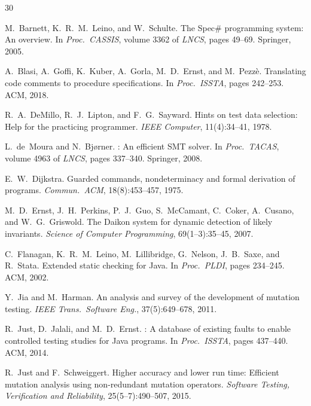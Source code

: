 \documentclass[11pt]{article}
\begin{document}
\begin{thebibliography}{30}

M.~Barnett, K.~R.~M.~Leino, and W.~Schulte.
\newblock The {Spec\#} programming system: An overview.
\newblock In \emph{Proc.\ CASSIS}, volume 3362 of \emph{LNCS}, pages 49--69.
  Springer, 2005.

A.~Blasi, A.~Goffi, K.~Kuber, A.~Gorla, M.~D.~Ernst, and M.~Pezz\`{e}.
\newblock Translating code comments to procedure specifications.
\newblock In \emph{Proc.\ ISSTA}, pages 242--253. ACM, 2018.

R.~A.~DeMillo, R.~J.~Lipton, and F.~G.~Sayward.
\newblock Hints on test data selection: Help for the practicing programmer.
\newblock \emph{IEEE Computer}, 11(4):34--41, 1978.

L.~de~Moura and N.~Bj{\o}rner.
: An efficient {SMT} solver.
\newblock In \emph{Proc.\ TACAS}, volume 4963 of \emph{LNCS}, pages 337--340.
  Springer, 2008.

E.~W.~Dijkstra.
\newblock Guarded commands, nondeterminacy and formal derivation of programs.
\newblock \emph{Commun.\ ACM}, 18(8):453--457, 1975.

M.~D.~Ernst, J.~H.~Perkins, P.~J.~Guo, S.~McCamant, C.~Coker, A.~Cusano,
  and W.~G.~Griswold.
\newblock The {Daikon} system for dynamic detection of likely invariants.
\newblock \emph{Science of Computer Programming}, 69(1--3):35--45, 2007.

C.~Flanagan, K.~R.~M.~Leino, M.~Lillibridge, G.~Nelson, J.~B.~Saxe, and
  R.~Stata.
\newblock Extended static checking for {Java}.
\newblock In \emph{Proc.\ PLDI}, pages 234--245. ACM, 2002.

Y.~Jia and M.~Harman.
\newblock An analysis and survey of the development of mutation testing.
\newblock \emph{IEEE Trans.\ Software Eng.}, 37(5):649--678, 2011.

R.~Just, D.~Jalali, and M.~D.~Ernst.
: A database of existing faults to enable controlled
  testing studies for {Java} programs.
\newblock In \emph{Proc.\ ISSTA}, pages 437--440. ACM, 2014.

R.~Just and F.~Schweiggert.
\newblock Higher accuracy and lower run time: Efficient mutation analysis using
  non-redundant mutation operators.
\newblock \emph{Software Testing, Verification and Reliability}, 25(5--7):490--507, 2015.


\end{thebibliography}
\end{document}
